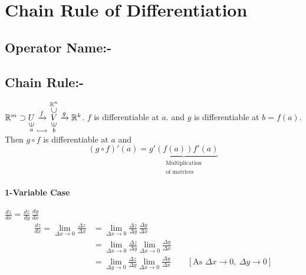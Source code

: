 \chapter{Chain Rule of Differentiation}
\section{Operator Name:-}

\section{Chain Rule:-}

\begin{Theorem}{}{}
	$\bbR^m\supset \underset{  \substack{{\uin} \\ {a}}  }{U} \underset{  \substack{\quad \\[0.25cm]\longmapsto}}{\xrightarrow{f}}   \underset{\substack{  \uin \\ b}}{  \overset{\substack{{\bbR^n} \\ \usubset}}{V}  }\xrightarrow{g}\bbR^k $. $f$ is differentiable at $a$. and $g$  is differentiable at $b=f(a)$. Then $g\circ f$ is differentiable at $a$  and $$(g\circ f)'(a)=\underbrace{g'(f(a))f'(a)}_{\substack{\text{Multiplication}\\ \text{of matrices}}}$$
\end{Theorem}
\begin{myproof}
	\subsubsection{1-Variable Case}
	$\frac{dz}{dx}=\frac{dz}{dy}\, \frac{dy}{dx}$\begin{align*}
		\frac{dz}{dx} =\lim_{\Delta x\to 0} \frac{\Delta z}{\Delta x} &=\lim_{\Delta x\to 0}\frac{\Delta z}{\Delta y}\, \frac{\Delta y}{\Delta x}\\
		& =\lim_{\Delta x\to 0}\frac{\Delta z}{\Delta y}\lim_{\Delta x\to 0} \frac{\Delta y}{\Delta x}\\
		& =\lim_{\Delta y\to 0}\frac{\Delta z}{\Delta y}\lim_{\Delta x\to 0} \frac{\Delta y}{\Delta x}\qquad [\text{As }\Delta x\to0,\ \Delta y\to 0]
	\end{align*}
\end{myproof}